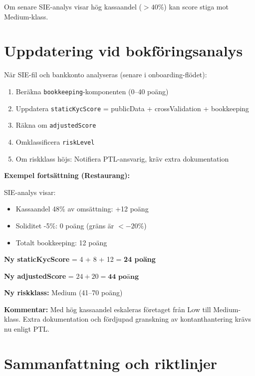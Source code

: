 \documentclass[12pt,a4paper]{article}
\begin{document}
Om senare SIE-analys visar hög kassaandel ($>40\%$) kan score stiga mot Medium-klass.

\section{Uppdatering vid bokföringsanalys}

När SIE-fil och bankkonto analyseras (senare i onboarding-flödet):

\begin{enumerate}[noitemsep]
  \item Beräkna \texttt{bookkeeping}-komponenten (0–40 poäng)
  \item Uppdatera \texttt{staticKycScore} = publicData + crossValidation + bookkeeping
  \item Räkna om \texttt{adjustedScore}
  \item Omklassificera \texttt{riskLevel}
  \item Om riskklass höjs: Notifiera PTL-ansvarig, kräv extra dokumentation
\end{enumerate}

\textbf{Exempel fortsättning (Restaurang):}

SIE-analys visar:
\begin{itemize}[noitemsep]
  \item Kassaandel 48\% av omsättning: +12 poäng
  \item Soliditet -5\%: 0 poäng (gräns är $< -20\%$)
  \item Totalt bookkeeping: 12 poäng
\end{itemize}

\textbf{Ny staticKycScore} = 4 + 8 + 12 = \textbf{24 poäng}

\textbf{Ny adjustedScore} = $24 + 20 = \textbf{44 poäng}$

\textbf{Ny riskklass:} Medium (41–70 poäng)

\textbf{Kommentar:} Med hög kassaandel eskaleras företaget från Low till Medium-klass. Extra dokumentation och fördjupad granskning av kontanthantering krävs nu enligt PTL.

\section{Sammanfattning och riktlinjer}
\end{document}
